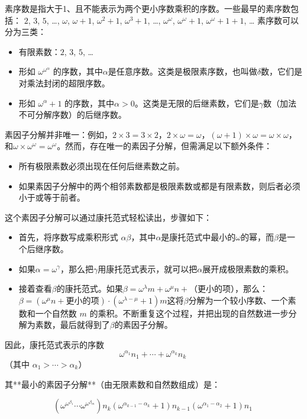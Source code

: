 素序数是指大于1、且不能表示为两个更小序数乘积的序数。一些最早的素序数包括：  
\(2\), \(3\), \(5\), …, \(\omega\), \(\omega + 1\), \(\omega^2 + 1\), \(\omega^3 + 1\), …, \(\omega^\omega\), \(\omega^\omega + 1\), \(\omega^\omega + 1 + 1\), … 素序数可以分为三类：
\begin{itemize}
\item 有限素数：\(2\), \(3\), \(5\), …  
\item 形如 \(\omega^{\omega^\alpha}\) 的序数，其中\(\alpha\)是任意序数。这类是极限素序数，也叫做\(\delta\)数，它们是对乘法封闭的超限序数。  
\item 形如 \(\omega^\alpha + 1\) 的序数，其中\(\alpha > 0\)。这类是无限的后继素数，它们是\(\gamma\)数（加法不可分解序数）的后继序数。
\end{itemize}
素因子分解并非唯一：例如，\(2 \times 3 = 3 \times 2\)，\(2 \times \omega = \omega\)，\((\omega + 1) \times \omega = \omega \times \omega\)，和\(\omega \times \omega^\omega = \omega^\omega\)。然而，存在唯一的素因子分解，但需满足以下额外条件：  
\begin{itemize}
\item 所有极限素数必须出现在任何后继素数之前。  
\item 如果素因子分解中的两个相邻素数都是极限素数或都是有限素数，则后者必须小于或等于前者。
\end{itemize}
这个素因子分解可以通过康托范式轻松读出，步骤如下：
\begin{itemize}
\item 首先，将序数写成乘积形式 \(\alpha \beta\)，其中\(\alpha\)是康托范式中最小的\(\omega\)的幂，而\(\beta\)是一个后继序数。
\item 如果\(\alpha = \omega^\gamma\)，那么把\(\gamma\)用康托范式表示，就可以把\(\alpha\)展开成极限素数的乘积。
\item 接着查看\(\beta\)的康托范式。如果\(\beta = \omega^\lambda m + \omega^\mu n +\)（更小的项），那么：\(\beta = (\omega^\mu n + \text{更小的项}) \cdot (\omega^{\lambda - \mu} + 1)m\)这将\(\beta\)分解为一个较小序数、一个素数和一个自然数 \(m\) 的乘积。不断重复这个过程，并把出现的自然数进一步分解为素数，最后就得到了\(\beta\)的素因子分解。
\end{itemize}
因此，康托范式表示的序数  
\[
\omega^{\alpha_1}n_1 + \cdots + \omega^{\alpha_k}n_k~
\]
（其中 \(\alpha_1 > \cdots > \alpha_k\)）  

其**最小的素因子分解**（由无限素数和自然数组成）是：  

\[
\left(\omega^{\omega^{\beta_1}} \cdots \omega^{\omega^{\beta_m}}\right)n_k(\omega^{\alpha_{k-1} - \alpha_k} + 1)n_{k-1}(\omega^{\alpha_1 - \alpha_2} + 1)n_1~
\]

